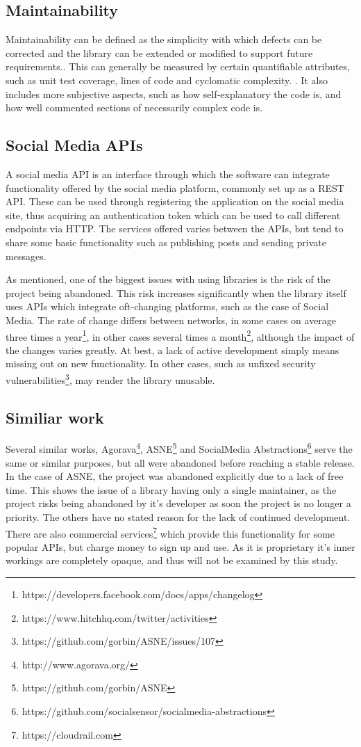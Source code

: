 \documentclass{sigchi-alternate}
\begin{document}
\subsection{Maintainability}
Maintainability can be defined as the simplicity with which defects can be corrected and the library can be extended or modified to support future 
requirements.\autocite{5733835}. This can generally be measured by certain quantifiable attributes, such as unit test coverage, lines of code and cyclomatic complexity.
\autocite{SONARQUBE_MAINTAINABILITY_DEFINITION}. It also includes more subjective aspects, such as how self-explanatory the code is, and how well commented sections
of necessarily complex code is.

\subsection{Social Media APIs}
A social media API is an interface through which the software can integrate functionality offered by the social media platform, commonly set up as a REST API. 
These can be used through registering the application on the social media site, thus acquiring an authentication token which can be used to call different
endpoints via HTTP. The services offered varies between the APIs, but tend to share some basic functionality such as publishing posts and sending private messages.

As mentioned, one of the biggest issues with using libraries is the risk of the project being abandoned. This risk increases significantly when the library
itself uses APIs which integrate oft-changing platforms, such as the case of Social Media. The rate of change differs between networks, in some cases on average
three times a year\footnote{https://developers.facebook.com/docs/apps/changelog}, in other cases several times a month\footnote{https://www.hitchhq.com/twitter/activities},
although the impact of the changes varies greatly. At best, a lack of active development simply means missing out on new functionality. In other cases, such as 
unfixed security vulnerabilities\footnote{https://github.com/gorbin/ASNE/issues/107}, may render the library unusable.

\subsection{Similiar work}
Several similar works, Agorava\footnote{http://www.agorava.org/}, ASNE\footnote{https://github.com/gorbin/ASNE} and 
SocialMedia Abstractions\footnote{https://github.com/socialsensor/socialmedia-abstractions} serve the same or similar purposes, but all were abandoned before reaching a 
stable release. In the case of ASNE, the project was abandoned explicitly due to a lack of free time. This shows the issue of a library having only a single maintainer, 
as the project risks being abandoned by it's developer as soon the project is no longer a priority. The others have no stated reason for the lack of continued development.
There are also commercial services\footnote{https://cloudrail.com} which provide this functionality for some popular APIs, but charge money to sign up 
and use. As it is proprietary it's inner workings are completely opaque, and thus will not be examined by this study.
\end{document}
